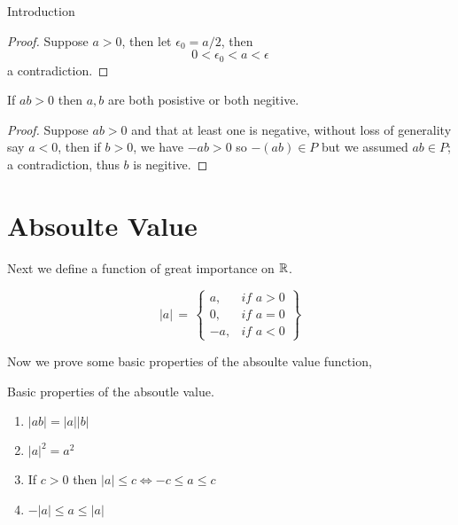 \begin{chapter}{Introduction}
    
    \begin{proof}
        Suppose $a > 0$, then let $\epsilon_0 = a/2$, then 
        \[0 < \epsilon_0 < a < \epsilon\]
        a contradiction.
    \end{proof}

    
    \begin{thm}
        If $ab > 0$ then $a, b$ are both posistive or both negitive. 

    \end{thm}

    
    \begin{proof}
        Suppose $ab > 0$ and that at least one is negative, without loss of generality say $a < 0$, then if $b > 0$, we have 
        $-ab > 0$ so $-(ab) \in P$ but we assumed $ab \in P$; a contradiction, thus $b$ is negitive. 
    \end{proof}

    \section{Absoulte Value}
    Next we define a function of great importance on $\mathbb{R}$. 

    
    \begin{equation}
        |a| \, = \, 
        \left\{
        \begin{array}{lr}
             a, & \textit{if }  a > 0 \\ 
             0, & \textit{if } a = 0 \\ 
            -a, & \textit{if } a < 0 
        \end{array}
        \right\}
    \end{equation}

    Now we prove some basic properties of the absoulte value function, 

    
    \begin{thm}
        Basic properties of the absoutle value. 
        \begin{enumerate}
            \item $|ab| = |a||b|$
            \item $|a|^2 = a^2 $
            \item If $c  > 0$ then $|a| \leq c \Leftrightarrow -c \leq a \leq c$
            \item $-|a| \leq a \leq |a|$
        \end{enumerate}
    \end{thm}


\end{chapter}
